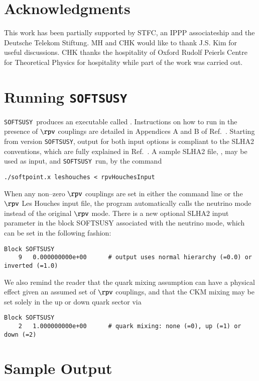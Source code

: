 \documentclass[pdflatex,final,3p,times]{elsarticle}
\def\SOFTSUSY{{\tt SOFTSUSY}}
\begin{document}
\section*{Acknowledgments}
This work has been partially supported by STFC, an IPPP associateship
and the Deutsche Telekom Stiftung. MH and CHK would like to thank
J.S. Kim for useful discussions.  CHK thanks the hospitality of Oxford
Rudolf Peierls Centre for Theoretical Physics for hospitality while
part of the work was carried out.

\appendix

\section{Running \SOFTSUSY}
\label{sec:run}

\SOFTSUSY~produces an executable called .  
Instructions on how to run
 in the presence of $\rpv$ couplings are detailed in
Appendices A and B of Ref.~\cite{Allanach:2009bv}.  
Starting from version
\SOFTSUSY{}, output for both input options is compliant to the SLHA2
conventions, which are fully explained in Ref.~\cite{Allanach:2008qq}.
A sample SLHA2 file, , may be used as input, and
\SOFTSUSY~run,  by the command 
\begin{verbatim}
./softpoint.x leshouches < rpvHouchesInput
\end{verbatim}
When any non--zero $\rpv$ couplings are set in either the command line 
or the $\rpv$ Les Houches input file, the program
automatically calls the neutrino mode instead of the original $\rpv$
mode. There is a new optional SLHA2 input parameter in the block SOFTSUSY
associated 
with the neutrino mode, which can be set in the following fashion: 
\begin{verbatim}
Block SOFTSUSY
    9   0.000000000e+00      # output uses normal hierarchy (=0.0) or inverted (=1.0)
\end{verbatim}
We also remind the reader that the quark mixing assumption can have a physical
effect given an assumed set of $\rpv$ couplings, and that the CKM mixing may be
set solely in the up or down quark sector via
\begin{verbatim}
Block SOFTSUSY
    2   1.000000000e+00      # quark mixing: none (=0), up (=1) or down (=2)
\end{verbatim}


\section{Sample Output \label{sec:output}}
\end{document}

